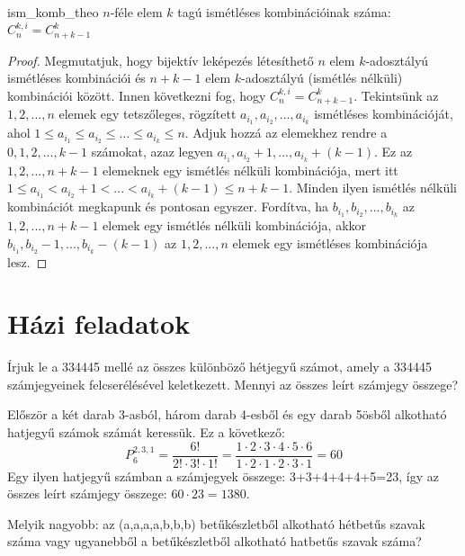 \begin{theorem}{ism_komb_theo}
$n$-féle elem $k$ tagú ismétléses kombinációinak száma: $C_{n}^{k,i}=C_{n+k-1}^{k}$ \cite{komb} 
\end{theorem}

\begin{proof}
Megmutatjuk, hogy bijektív leképezés létesíthető $n$ elem $k$-adosztályú
ismétléses kombinációi és $n+k-1$ elem $k$-adosztályú (ismétlés
nélküli) kombinációi között. Innen következni fog, hogy $C_{n}^{k,i}=C_{n+k-1}^{k}.$
Tekintsünk az $1,2,...,n$ elemek egy tetszőleges, rögzített $a_{i_{1}},a_{i_{2}},...,a_{i_{k}}$
ismétléses kombinációját, ahol $1\leq a_{i_{1}}\leq a_{i_{2}}\leq...\leq a_{i_{k}}\leq n$.
Adjuk hozzá az elemekhez rendre a $0,1,2,...,k-1$ számokat, azaz
legyen $a_{i_{1}},a_{i_{2}}+1,...,a_{i_{k}}+(k-1)$. Ez az $1,2,...,n+k-1$
elemeknek egy ismétlés nélküli kombinációja, mert itt $1\leq a_{i_{1}}<a_{i_{2}}+1<...<a_{i_{k}}+(k-1)\leq n+k-1.$
Minden ilyen ismétlés nélküli kombinációt megkapunk és pontosan egyszer.
Fordítva, ha $b_{i_{1}},b_{i_{2}},...,b_{i_{k}}$ az $1,2,...,n+k-1$
elemek egy ismétlés nélküli kombinációja, akkor $b_{i_{1}},b_{i_{2}}-1,...,b_{i_{k}}-(k-1)$
az $1,2,...,n$ elemek egy ismétléses kombinációja lesz. 
\end{proof}

\section*{Házi feladatok}
\begin{problem}
Írjuk le a 334445 mellé az összes különböző hétjegyű számot, amely
a 334445 számjegyeinek felcserélésével keletkezett. Mennyi az összes
leírt számjegy összege? 
\end{problem}

\begin{solution}
Először a két darab 3-asból, három darab 4-esből és egy darab 5ösből
alkotható hatjegyű számok számát keressük. Ez a következő: 
\[
P_{6}^{2,3,1}=\frac{6!}{2!\cdot3!\cdot1!}=\frac{1\cdot2\cdot3\cdot4\cdot5\cdot6}{1\cdot2\cdot1\cdot2\cdot3\cdot1}=60
\]
Egy ilyen hatjegyű számban a számjegyek összege: 3+3+4+4+4+5=23, így
az összes leírt számjegy összege: $60\cdot23=1380.$ 
\end{solution}
\begin{problem}
Melyik nagyobb: az (a,a,a,a,b,b,b) betűkészletből alkotható hétbetűs
szavak száma vagy ugyanebből a betűkészletből alkotható hatbetűs szavak
száma? 
\end{problem}

